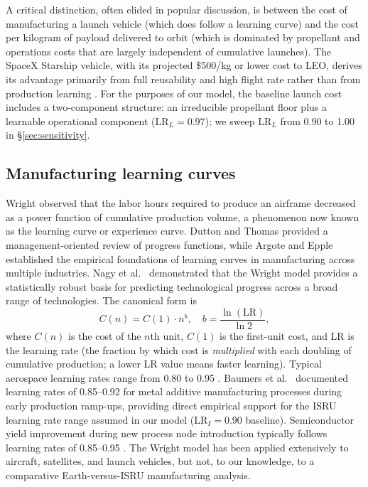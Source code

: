 \documentclass[preprint,12pt]{elsarticle}
\begin{document}
A critical distinction, often elided in popular discussion, is between the cost of manufacturing a launch vehicle (which does follow a learning curve) and the cost per kilogram of payload delivered to orbit (which is dominated by propellant and operations costs that are largely independent of cumulative launches). The SpaceX Starship vehicle, with its projected \$500/kg or lower cost to LEO, derives its advantage primarily from full reusability and high flight rate rather than from production learning \cite{jones2020,jones2022}. For the purposes of our model, the baseline launch cost includes a two-component structure: an irreducible propellant floor plus a learnable operational component ($\mathrm{LR}_L = 0.97$); we sweep $\mathrm{LR}_L$ from 0.90 to 1.00 in \S\ref{sec:sensitivity}.

\subsection{Manufacturing learning curves}

Wright \cite{wright1936} observed that the labor hours required to produce an airframe decreased as a power function of cumulative production volume, a phenomenon now known as the learning curve or experience curve. Dutton and Thomas \cite{dutton1984} provided a management-oriented review of progress functions, while Argote and Epple \cite{argote1990} established the empirical foundations of learning curves in manufacturing across multiple industries. Nagy et al.\ \cite{nagy2013} demonstrated that the Wright model provides a statistically robust basis for predicting technological progress across a broad range of technologies. The canonical form is
\begin{equation}
  C(n) = C(1) \cdot n^{b}, \quad b = \frac{\ln(\text{LR})}{\ln 2},
  \label{eq:wright}
\end{equation}
where $C(n)$ is the cost of the $n$th unit, $C(1)$ is the first-unit cost, and LR is the learning rate (the fraction by which cost is \emph{multiplied} with each doubling of cumulative production; a lower LR value means faster learning). Typical aerospace learning rates range from 0.80 to 0.95 \cite{wertz2011}. Baumers et al.\ \cite{baumers2016} documented learning rates of 0.85--0.92 for metal additive manufacturing processes during early production ramp-ups, providing direct empirical support for the ISRU learning rate range assumed in our model ($\mathrm{LR}_I = 0.90$ baseline). Semiconductor yield improvement during new process node introduction typically follows learning rates of 0.85--0.95 \cite{nagy2013}. The Wright model has been applied extensively to aircraft, satellites, and launch vehicles, but not, to our knowledge, to a comparative Earth-versus-ISRU manufacturing analysis.
\end{document}
